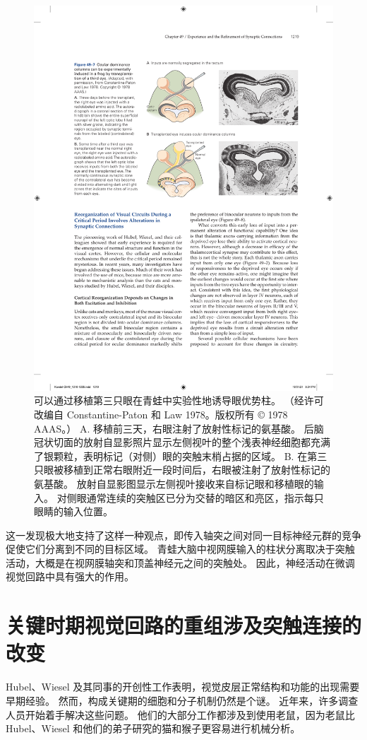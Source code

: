 \begin{figure}[htbp]
	\centering
	\includegraphics[width=0.7\linewidth]{chap49/fig_49_7}
	\caption{可以通过移植第三只眼在青蛙中实验性地诱导眼优势柱。 （经许可改编自 Constantine-Paton 和 Law 1978。版权所有 © 1978 AAAS。） A. 移植前三天，右眼注射了放射性标记的氨基酸。 后脑冠状切面的放射自显影照片显示左侧视叶的整个浅表神经细胞都充满了银颗粒，表明标记（对侧）眼的突触末梢占据的区域。 B. 在第三只眼被移植到正常右眼附近一段时间后，右眼被注射了放射性标记的氨基酸。 放射自显影图显示左侧视叶接收来自标记眼和移植眼的输入。 对侧眼通常连续的突触区已分为交替的暗区和亮区，指示每只眼睛的输入位置。}
	\label{fig:49_7}
\end{figure}


这一发现极大地支持了这样一种观点，即传入轴突之间对同一目标神经元群的竞争促使它们分离到不同的目标区域。
青蛙大脑中视网膜输入的柱状分离取决于突触活动，大概是在视网膜轴突和顶盖神经元之间的突触处。
因此，神经活动在微调视觉回路中具有强大的作用。



\section{关键时期视觉回路的重组涉及突触连接的改变}

Hubel、Wiesel 及其同事的开创性工作表明，视觉皮层正常结构和功能的出现需要早期经验。
然而，构成关键期的细胞和分子机制仍然是个谜。
近年来，许多调查人员开始着手解决这些问题。 他们的大部分工作都涉及到使用老鼠，因为老鼠比 Hubel、Wiesel 和他们的弟子研究的猫和猴子更容易进行机械分析。



